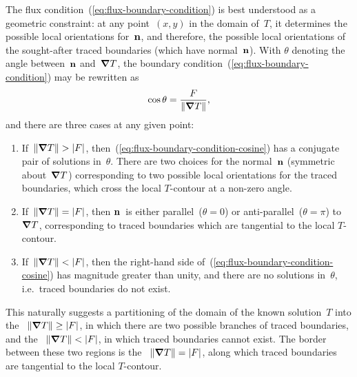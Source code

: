The flux condition~(\ref{eq:flux-boundary-condition})
is best understood as a geometric constraint:
at any point~$(x, y)$ in the domain of~$T$,
it determines the possible local orientations for~$\mathop{}\!\boldsymbol{\mathbf{n}}$,
and therefore, the possible local orientations
of the sought-after traced boundaries
(which have normal~$\mathop{}\!\boldsymbol{\mathbf{n}}$).
With $\theta$ denoting the angle between~$\mathop{}\!\boldsymbol{\mathbf{n}}$ and~$\mathop{}\!\boldsymbol{\mathbf{\nabla}} T$,
the boundary condition~(\ref{eq:flux-boundary-condition}) may be rewritten as
\begin{equation}
  \cos\theta = \frac{F}{\lVert\mathop{}\!\boldsymbol{\mathbf{\nabla}} T\rVert},
  \label{eq:flux-boundary-condition-cosine}
\end{equation}
and there are three cases at any given point:
\begin{enumerate}
  \item
    If~$\lVert\mathop{}\!\boldsymbol{\mathbf{\nabla}} T\rVert > \lvert F\rvert$,
    then~(\ref{eq:flux-boundary-condition-cosine})
    has a conjugate pair of solutions in~$\theta$.
    There are two choices for the normal~$\mathop{}\!\boldsymbol{\mathbf{n}}$
    (symmetric about~$\mathop{}\!\boldsymbol{\mathbf{\nabla}} T$)
    corresponding to two possible local orientations
    for the traced boundaries,
    which cross the local $T$-contour at a non-zero angle.
  \item
    If~$\lVert\mathop{}\!\boldsymbol{\mathbf{\nabla}} T\rVert = \lvert F\rvert$,
    then $\mathop{}\!\boldsymbol{\mathbf{n}}$~is either parallel~($\theta = 0$)
    or anti-parallel~($\theta = \pi$) to~$\mathop{}\!\boldsymbol{\mathbf{\nabla}} T$,
    corresponding to traced boundaries which are tangential
    to the local $T$-contour.
  \item
    If~$\lVert\mathop{}\!\boldsymbol{\mathbf{\nabla}} T\rVert < \lvert F\rvert$,
    then the right-hand side of~(\ref{eq:flux-boundary-condition-cosine})
    has magnitude greater than unity,
    and there are no solutions in~$\theta$,
    i.e.~traced boundaries do not exist.
\end{enumerate}
This naturally suggests a partitioning of
the domain of the known solution~$T$ into
the ~$\lVert\mathop{}\!\boldsymbol{\mathbf{\nabla}} T\rVert \ge \lvert F\rvert$,
in which there are two possible branches of traced boundaries,
and the ~$\lVert\mathop{}\!\boldsymbol{\mathbf{\nabla}} T\rVert < \lvert F\rvert$,
in which traced boundaries cannot exist.
The border between these two regions is
the ~$\lVert\mathop{}\!\boldsymbol{\mathbf{\nabla}} T\rVert = \lvert F\rvert$,
along which traced boundaries are tangential to the local $T$-contour.

